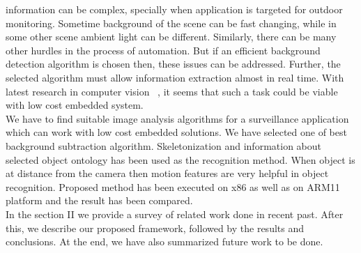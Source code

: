\documentclass[conference]{IEEEtran}
\begin{document}
information can be complex, specially when application is targeted for
outdoor monitoring. Sometime background of the scene can be fast
changing, while in some other scene ambient light can be different.
Similarly, there can be many other hurdles in the process of automation.
But if an efficient background detection algorithm is chosen then, these
issues can be addressed. Further, the selected algorithm must allow
information extraction almost in real time. With latest research in
computer vision ~\cite{3, 5}, it seems that such a task could be
viable with low cost embedded system.\\
\indent We have to find suitable image analysis algorithms for a
surveillance application which can work with low cost embedded solutions.
We have selected one of best ~\cite{5} background subtraction algorithm.
Skeletonization and information about selected object ontology
has been used as the recognition method. When object is at distance from
the camera then motion features are very helpful in object recognition.
Proposed method has been executed on x86 as well as on ARM11 platform
and the result has been compared. \\
\indent In the  section II we provide a survey of related work done in
recent past. After this, we describe our proposed framework, followed by
the results and conclusions.  At the end, we have also summarized future
work to be done.
\end{document}
